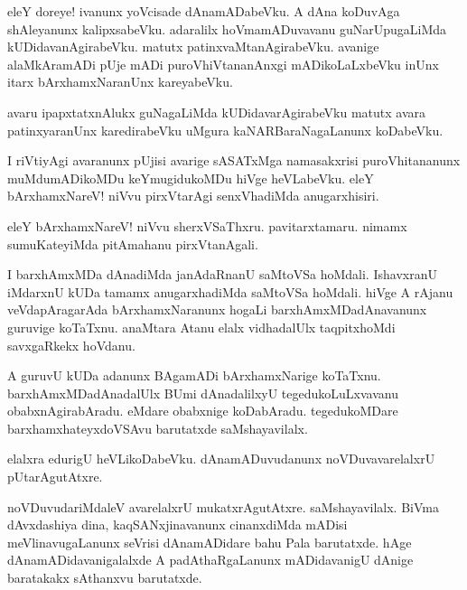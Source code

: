 \begin{mng}
eleY doreye! ivanunx yoVcisade dAnamADabeVku. A dAna koDuvAga shAleyanunx kalipxsabeVku. adaralilx hoVmamADuvavanu guNarUpugaLiMda kUDidavanAgirabeVku. matutx patinxvaMtanAgirabeVku. avanige alaMkAramADi pUje mADi puroVhiVtananAnxgi mADikoLaLxbeVku inUnx itarx bArxhamxNaranUnx kareyabeVku.
\end{mng}

\begin{mng}
avaru ipapxtatxnAlukx guNagaLiMda kUDidavarAgirabeVku matutx avara patinxyaranUnx karedirabeVku uMgura kaNARBaraNagaLanunx koDabeVku.
\end{mng}

\begin{mng}
I riVtiyAgi avaranunx pUjisi avarige sASATxMga namasakxrisi puroVhitananunx muMdumADikoMDu keYmugidukoMDu hiVge heVLabeVku. eleY bArxhamxNareV! niVvu pirxVtarAgi senxVhadiMda anugarxhisiri.
\end{mng}

\begin{mng}
eleY bArxhamxNareV! niVvu sherxVSaThxru. pavitarxtamaru. nimamx sumuKateyiMda pitAmahanu pirxVtanAgali.
\end{mng}

\begin{mng}
I barxhAmxMDa dAnadiMda janAdaRnanU saMtoVSa hoMdali. IshavxranU iMdarxnU kUDa tamamx anugarxhadiMda saMtoVSa hoMdali. hiVge A rAjanu veVdapAragarAda bArxhamxNaranunx hogaLi barxhAmxMDadAnavanunx guruvige koTaTxnu. anaMtara Atanu elalx vidhadalUlx taqpitxhoMdi savxgaRkekx hoVdanu.
\end{mng}

\begin{mng}
A guruvU kUDa adanunx BAgamADi bArxhamxNarige koTaTxnu. barxhAmxMDadAnadalUlx BUmi dAnadalilxyU tegedukoLuLxvavanu obabxnAgirabAradu. eMdare obabxnige koDabAradu. tegedukoMDare barxhamxhateyxdoVSAvu barutatxde saMshayavilalx.
\end{mng}

\begin{mng}
elalxra edurigU heVLikoDabeVku. dAnamADuvudanunx noVDuvavarelalxrU pUtarAgutAtxre.
\end{mng}

\begin{mng}
noVDuvudariMdaleV avarelalxrU mukatxrAgutAtxre. saMshayavilalx. BiVma dAvxdashiya dina, kaqSANxjinavanunx cinanxdiMda mADisi meVlinavugaLanunx seVrisi dAnamADidare bahu Pala barutatxde. hAge dAnamADidavanigalalxde A padAthaRgaLanunx mADidavanigU dAnige baratakakx sAthanxvu barutatxde.
\end{mng}

